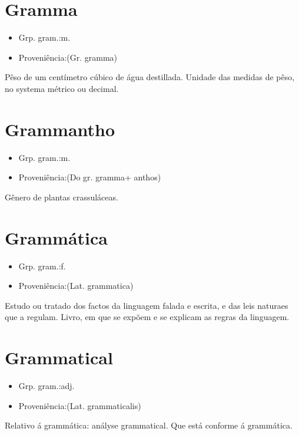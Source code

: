 \section{Gramma}
\begin{itemize}
\item {Grp. gram.:m.}
\end{itemize}
\begin{itemize}
\item {Proveniência:(Gr. \textunderscore gramma\textunderscore )}
\end{itemize}
Pêso de um centímetro cúbico de água destillada.
Unidade das medidas de pêso, no systema métrico ou decimal.
\section{Grammantho}
\begin{itemize}
\item {Grp. gram.:m.}
\end{itemize}
\begin{itemize}
\item {Proveniência:(Do gr. \textunderscore gramma\textunderscore  + \textunderscore anthos\textunderscore )}
\end{itemize}
Gênero de plantas crassuláceas.
\section{Grammática}
\begin{itemize}
\item {Grp. gram.:f.}
\end{itemize}
\begin{itemize}
\item {Proveniência:(Lat. \textunderscore grammatica\textunderscore )}
\end{itemize}
Estudo ou tratado dos factos da linguagem falada e escrita, e das leis naturaes que a regulam.
Livro, em que se expõem e se explicam as regras da linguagem.
\section{Grammatical}
\begin{itemize}
\item {Grp. gram.:adj.}
\end{itemize}
\begin{itemize}
\item {Proveniência:(Lat. \textunderscore grammaticalis\textunderscore )}
\end{itemize}
Relativo á grammática: \textunderscore anályse grammatical\textunderscore .
Que está conforme á grammática.

